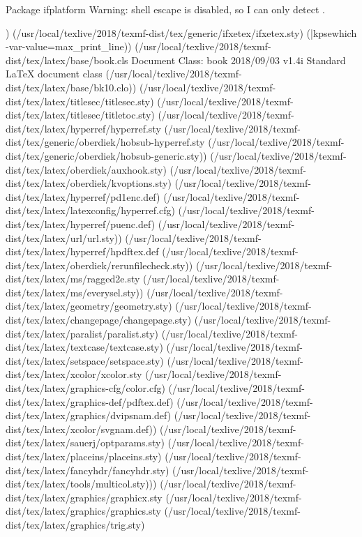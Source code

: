 Package ifplatform Warning: 
    shell escape is disabled, so I can only detect \ifwindows.

) (/usr/local/texlive/2018/texmf-dist/tex/generic/ifxetex/ifxetex.sty)
(|kpsewhich -var-value=max_print_line))
(/usr/local/texlive/2018/texmf-dist/tex/latex/base/book.cls
Document Class: book 2018/09/03 v1.4i Standard LaTeX document class
(/usr/local/texlive/2018/texmf-dist/tex/latex/base/bk10.clo))
(/usr/local/texlive/2018/texmf-dist/tex/latex/titlesec/titlesec.sty)
(/usr/local/texlive/2018/texmf-dist/tex/latex/titlesec/titletoc.sty)
(/usr/local/texlive/2018/texmf-dist/tex/latex/hyperref/hyperref.sty
(/usr/local/texlive/2018/texmf-dist/tex/generic/oberdiek/hobsub-hyperref.sty
(/usr/local/texlive/2018/texmf-dist/tex/generic/oberdiek/hobsub-generic.sty))
(/usr/local/texlive/2018/texmf-dist/tex/latex/oberdiek/auxhook.sty)
(/usr/local/texlive/2018/texmf-dist/tex/latex/oberdiek/kvoptions.sty)
(/usr/local/texlive/2018/texmf-dist/tex/latex/hyperref/pd1enc.def)
(/usr/local/texlive/2018/texmf-dist/tex/latex/latexconfig/hyperref.cfg)
(/usr/local/texlive/2018/texmf-dist/tex/latex/hyperref/puenc.def)
(/usr/local/texlive/2018/texmf-dist/tex/latex/url/url.sty))
(/usr/local/texlive/2018/texmf-dist/tex/latex/hyperref/hpdftex.def
(/usr/local/texlive/2018/texmf-dist/tex/latex/oberdiek/rerunfilecheck.sty))
(/usr/local/texlive/2018/texmf-dist/tex/latex/ms/ragged2e.sty
(/usr/local/texlive/2018/texmf-dist/tex/latex/ms/everysel.sty))
(/usr/local/texlive/2018/texmf-dist/tex/latex/geometry/geometry.sty)
(/usr/local/texlive/2018/texmf-dist/tex/latex/changepage/changepage.sty)
(/usr/local/texlive/2018/texmf-dist/tex/latex/paralist/paralist.sty)
(/usr/local/texlive/2018/texmf-dist/tex/latex/textcase/textcase.sty)
(/usr/local/texlive/2018/texmf-dist/tex/latex/setspace/setspace.sty)
(/usr/local/texlive/2018/texmf-dist/tex/latex/xcolor/xcolor.sty
(/usr/local/texlive/2018/texmf-dist/tex/latex/graphics-cfg/color.cfg)
(/usr/local/texlive/2018/texmf-dist/tex/latex/graphics-def/pdftex.def)
(/usr/local/texlive/2018/texmf-dist/tex/latex/graphics/dvipsnam.def)
(/usr/local/texlive/2018/texmf-dist/tex/latex/xcolor/svgnam.def))
(/usr/local/texlive/2018/texmf-dist/tex/latex/sauerj/optparams.sty)
(/usr/local/texlive/2018/texmf-dist/tex/latex/placeins/placeins.sty)
(/usr/local/texlive/2018/texmf-dist/tex/latex/fancyhdr/fancyhdr.sty)
(/usr/local/texlive/2018/texmf-dist/tex/latex/tools/multicol.sty)))
(/usr/local/texlive/2018/texmf-dist/tex/latex/graphics/graphicx.sty
(/usr/local/texlive/2018/texmf-dist/tex/latex/graphics/graphics.sty
(/usr/local/texlive/2018/texmf-dist/tex/latex/graphics/trig.sty)
